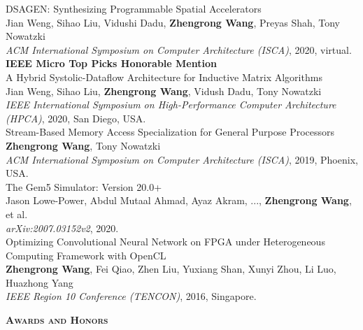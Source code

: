 \documentclass[a4paper]{article}
\newenvironment{changemargin}[2]{%
  \begin{list}{}{%
    \setlength{\topsep}{0pt}%
    \setlength{\leftmargin}{#1}%
    \setlength{\rightmargin}{#2}%
    \setlength{\listparindent}{\parindent}%
    \setlength{\itemindent}{\parindent}%
    \setlength{\parsep}{\parskip}%
  }%
  \item[]}{\end{list}
}
\newcommand{\lineover}{
	\begin{changemargin}{-0.05in}{-0.05in}
		\vspace*{-8pt}
		\hrulefill \\
		\vspace*{-2pt}
	\end{changemargin}
}
\newcommand{\header}[1]{
	\begin{changemargin}{-0.5in}{-0.5in}
		\scshape{\large \textbf{#1}}\\
  	\lineover
	\end{changemargin}
}
\newenvironment{body} {
	\vspace*{-16pt}
	\begin{changemargin}{-0.5in}{-0.5in}
  }	
	{\end{changemargin}
}
\begin{document}
\begin{body}
	DSAGEN: Synthesizing Programmable Spatial Accelerators \\
	Jian Weng, Sihao Liu, Vidushi Dadu, \textbf{Zhengrong Wang}, Preyas Shah, Tony Nowatzki \\
	\emph{ACM International Symposium on Computer Architecture (ISCA)}, 2020, virtual.\\
	\textbf{IEEE Micro Top Picks Honorable Mention}\\
	\vspace{6pt}
	A Hybrid Systolic-Dataflow Architecture for Inductive Matrix Algorithms\\
	Jian Weng, Sihao Liu, \textbf{Zhengrong Wang}, Vidush Dadu, Tony Nowatzki \\
	\emph{IEEE International Symposium on High-Performance Computer Architecture (HPCA)}, 2020, San Diego, USA.\\
	\vspace{6pt}
	Stream-Based Memory Access Specialization for General Purpose Processors\\
	\textbf{Zhengrong Wang}, Tony Nowatzki \\
	\emph{ACM International Symposium on Computer Architecture (ISCA)}, 2019, Phoenix, USA.\\
	\vspace{6pt}
	The Gem5 Simulator: Version 20.0+\\
	Jason Lowe-Power, Abdul Mutaal Ahmad, Ayaz Akram, ..., \textbf{Zhengrong Wang}, et al. \\
	\emph{arXiv:2007.03152v2}, 2020.\\
	\vspace{6pt}
	Optimizing Convolutional Neural Network on FPGA under Heterogeneous Computing Framework with OpenCL\\
	\textbf{Zhengrong Wang}, Fei Qiao, Zhen Liu, Yuxiang Shan, Xunyi Zhou, Li Luo, Huazhong Yang \\
	\emph{IEEE Region 10 Conference (TENCON)}, 2016, Singapore.\\
\end{body}

\smallskip
\smallskip


\header{Awards and Honors}
\end{document}
